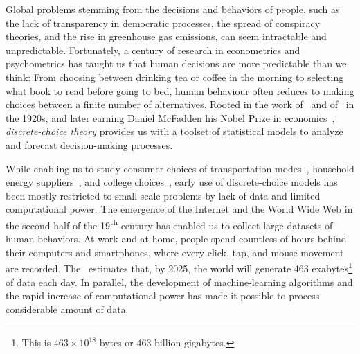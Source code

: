 Global problems stemming from the decisions and behaviors of people, such as the lack of transparency in democratic processes, the spread of conspiracy theories, and the rise in greenhouse gas emissions, can seem intractable and unpredictable.
Fortunately, a century of research in econometrics and psychometrics has taught us that human decisions are more predictable than we think:
From choosing between drinking tea or coffee in the morning to selecting what book to read before going to bed, human behaviour often reduces to making choices between a finite number of alternatives.
Rooted in the work of~\citet{thurstone1927law} and of~\citet{zermelo1928berechnung} in the 1920s, and later earning Daniel McFadden his Nobel Prize in economics~\citep{mcfadden2001economic}, \emph{discrete-choice theory} provides us with a toolset of statistical models to analyze and forecast decision-making processes.

While enabling us to study consumer choices of transportation modes~\citep{ben1973structure,mcfadden1974measurement}, household energy suppliers~\citep{goett2000customers}, and college choices~\citep{fuller1982new}, early use of discrete-choice models has been mostly restricted to small-scale problems by lack of data and limited computational power.
The emergence of the Internet and the World Wide Web in the second half of the 19\textsuperscript{th} century has enabled us to collect large datasets of human behaviors.
At work and at home, people spend countless of hours behind their computers and smartphones, where every click, tap, and mouse movement are recorded.
The~\citet{wef2019data} estimates that, by 2025, the world will generate 463 exabytes\footnote{This is $463 \times 10^{18}$ bytes or 463 billion gigabytes.} of data each day.
In parallel, the development of machine-learning algorithms and the rapid increase of computational power has made it possible to process considerable amount of data.


